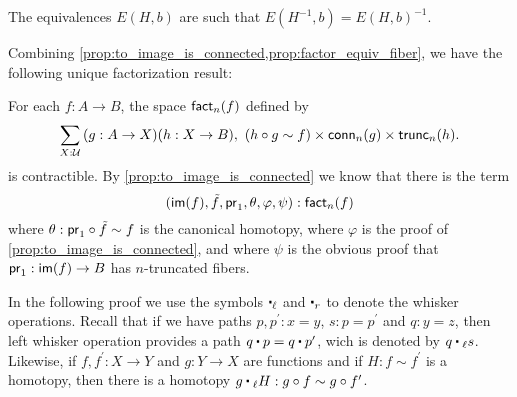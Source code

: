 The equivalences $E(H,b)$ are such that $E(H^{-1},b)= E(H,b)^{-1}$.

Combining \autoref{prop:to_image_is_connected,prop:factor_equiv_fiber}, we have the following unique factorization result:

\begin{thm}
For each $f:A\to B$, the space $\textsf{fact}_n(f)$ defined by
\begin{equation*}
\sm{X:\type}(g:A\to X)(h:X\to B),\ (h\circ g\sim f)\times\mathsf{conn}_n(g)\times\mathsf{trunc}_n(h).
\end{equation*}
is contractible. By \autoref{prop:to_image_is_connected} we know that there is the term
\begin{equation*}
{(\ensuremath{\mathsf{im}}(f),\tilde{f},\ensuremath{\mathsf{pr}_{1}},\theta,\varphi,\psi)}:\textsf{fact}_n(f)
\end{equation*}
where $\theta:\mathsf{pr}_{1}\circ\tilde{f}\sim f$ is the canonical homotopy, where $\varphi$ is the proof of
\autoref{prop:to_image_is_connected}, and where $\psi$ is the obvious proof that $\mathsf{pr}_{1}:\mathsf{im}(f)\to B$ has $n$-truncated fibers.
\end{thm}

In the following proof we use the symbols $\leftwhisker$ and $\rightwhisker$ to denote the whisker operations. Recall that if we have paths
$p,p^\prime:x= y$, $s:p= p^\prime$ and $q:y= z$, then left whisker operation provides a path $q\ct p=
q\ct p^\prime$, wich is denoted by $q\leftwhisker s$. Likewise, if $f,f^\prime:X\to Y$ and $g:Y\to X$ are functions and if $H:f\sim
f^\prime$ is a homotopy, then there is a homotopy $g\leftwhisker H:g\circ f\sim g\circ f^\prime$.

